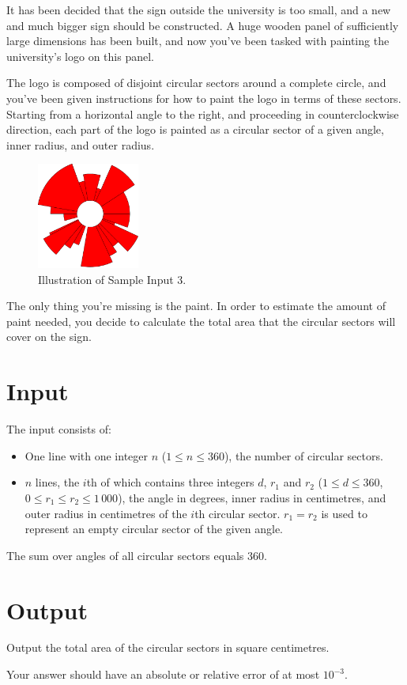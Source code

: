 
%
It has been decided that the sign outside the university is too small, and a
new and much bigger sign should be constructed. A huge wooden panel of
sufficiently large dimensions has been built, and now you've been tasked with
painting the university's logo on this panel.

The logo is composed of disjoint circular sectors around a complete circle, and
you've been given instructions for how to paint the logo in terms of these
sectors. Starting from a horizontal angle to the right, and proceeding in
counterclockwise direction, each part of the logo is painted as a circular
sector of a given angle, inner radius, and outer radius.

\begin{figure}[h!]
  \centering
  \includegraphics[width=0.30\textwidth]{logo}
  \caption{Illustration of Sample Input 3.}%
  \label{fig:sample3}
\end{figure}

The only thing you're missing is the paint. In order to estimate the amount of
paint needed, you decide to calculate the total area that the circular sectors
will cover on the sign.

\section*{Input}
The input consists of:
\begin{itemize}
    \item One line with one integer $n$ ($1 \le n \le 360$), the number of circular sectors.
    \item $n$ lines, the $i$th of which contains three integers $d$, $r_1$ and $r_2$ ($1\le d\le 360$, $0 \le r_1 \le r_2 \le 1\,000$), the angle in degrees, inner radius in centimetres, and outer radius in centimetres of the $i$th circular sector. $r_1=r_2$ is used to represent an empty circular sector of the given angle.
\end{itemize}

The sum over angles of all circular sectors equals $360$.

\section*{Output}
Output the total area of the circular sectors in square centimetres.

Your answer should have an absolute or relative error of at most $10^{-3}$.

